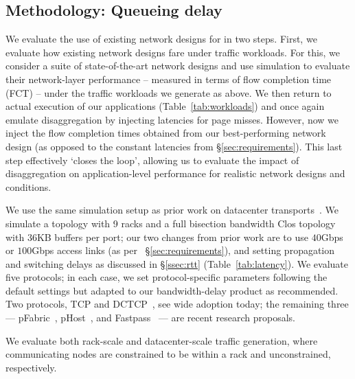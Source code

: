 \vspace{-0.1in}
\subsection{Methodology: Queueing delay}
\label{ssec:ssmethod}
\vspace{-0.05in}
We evaluate the use of existing network designs for \dis in two steps.
First, we evaluate how existing network designs fare under \dis traffic workloads. 
For this, we consider a suite of state-of-the-art network designs and use simulation to evaluate their network-layer performance -- measured in terms of flow completion time (FCT) -- under the traffic workloads we generate as above.
We then return to actual execution of our applications (Table~\ref{tab:workloads}) and once again emulate disaggregation by injecting latencies for page misses. 
However, now we inject the flow completion times obtained from our best-performing network design (as opposed to the constant latencies from \S\ref{sec:requirements}). This last step effectively `closes the loop', allowing us to evaluate the impact of disaggregation on application-level performance for realistic network designs and conditions. 

We use the same simulation setup as prior work on datacenter transports~\cite{pfabric, phost,dctcp}. 
We simulate a %
topology with 9 racks and a full bisection bandwidth Clos topology with $36$KB buffers per port; our two changes from prior work are to use $40$Gbps or $100$Gbps access links (as per ~\S\ref{sec:requirements}), and setting propagation and switching delays as discussed in \S\ref{ssec:rtt} (Table~\ref{tab:latency}).
We evaluate five protocols; in each case, we set protocol-specific parameters following the default settings but adapted to our bandwidth-delay product as recommended. Two protocols, TCP and DCTCP~\cite{dctcp}, see wide adoption today; the remaining three --- pFabric~\cite{pfabric}, pHost~\cite{phost}, and Fastpass~\cite{fastpass} --- are recent research proposals.

We evaluate both rack-scale and datacenter-scale traffic generation, where communicating nodes are constrained to be within a rack and unconstrained, respectively.


